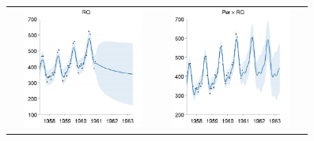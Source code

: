 \documentclass[twoside]{article}
\begin{document}
\begin{figure}[h!]
\centering
\newcommand{\wag}{4.8cm}  %
\newcommand{\hag}{4cm}  %
\begin{tabular}{c}
\includegraphics[width=\wag,height=\hag]{../figures/decomposition/01-airline-s_max_level_0/01-airline-s_all_small}
\hspace{-1cm} \includegraphics[width=\wag,height=\hag]{../figures/decomposition/01-airline-s_max_level_1/01-airline-s_all_small}

\end{tabular}
\end{figure}
\end{document}
